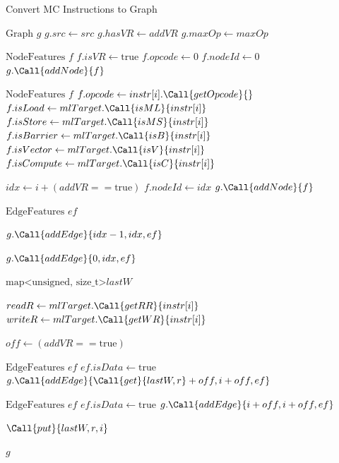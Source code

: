 \begin{algorithm}
\caption{Convert MC Instructions to Graph}
\begin{algorithmic}[1]
\small
\linespread{0.8}\selectfont
{}
    \State $\text{Graph } g$
    \State $g.src \gets src$
    \State $g.hasVR \gets addVR$
    \State $g.maxOp \gets maxOp$
    
        \State $\text{NodeFeatures } f$
        \State $f.isVR \gets \text{true}$
        \State $f.opcode \gets 0$
        \State $f.nodeId \gets 0$
        \State $g.\Call{addNode}{f}$
    \EndIf
    
        \State $\text{NodeFeatures } f$
        \State $f.opcode \gets instr[i].\Call{getOpcode}{}$
        \State $f.isLoad \gets mlTarget.\Call{isML}{instr[i]}$
        \State $f.isStore \gets mlTarget.\Call{isMS}{instr[i]}$
        \State $f.isBarrier \gets mlTarget.\Call{isB}{instr[i]}$
        \State $f.isVector \gets mlTarget.\Call{isV}{instr[i]}$
        \State $f.isCompute \gets mlTarget.\Call{isC}{instr[i]}$
        
        \State $idx \gets i + (addVR == \text{true})$
        \State $f.nodeId \gets idx$
        \State $g.\Call{addNode}{f}$
        
        \State $\text{EdgeFeatures } ef$
        
            \State $g.\Call{addEdge}{idx-1, idx, ef}$
        \EndIf
        
            \State $g.\Call{addEdge}{0, idx, ef}$
        \EndIf
    \EndFor
    
    \State $\text{map<unsigned, size\_t>} lastW$
    
        \State $readR \gets mlTarget.\Call{getRR}{instr[i]}$
        \State $writeR \gets mlTarget.\Call{getWR}{instr[i]}$
        
            \State $off \gets (addVR == \text{true})$
            
                \State $\text{EdgeFeatures } ef$
                \State $ef.isData \gets \text{true}$
                \State $g.\Call{addEdge}{\Call{get}{lastW, r} + off, i + off, ef}$
            \EndIf
            
                \State $\text{EdgeFeatures } ef$
                \State $ef.isData \gets \text{true}$
                \State $g.\Call{addEdge}{i + off, i + off, ef}$
            \EndIf
        \EndFor
        
            \State $\Call{put}{lastW, r, i}$
        \EndFor
    \EndFor
    
    \State \Return $g$
\EndFunction
\end{algorithmic}
\end{algorithm}

